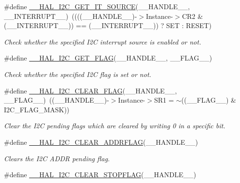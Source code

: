 \begin{DoxyCompactItemize}
\#define \hyperlink{group___i2_c___exported___macros_ga932024bf4a259e0cdaf9e50b38e3d41a}{\-\_\-\-\_\-\-H\-A\-L\-\_\-\-I2\-C\-\_\-\-G\-E\-T\-\_\-\-I\-T\-\_\-\-S\-O\-U\-R\-C\-E}(\-\_\-\-\_\-\-H\-A\-N\-D\-L\-E\-\_\-\-\_\-, \-\_\-\-\_\-\-I\-N\-T\-E\-R\-R\-U\-P\-T\-\_\-\-\_\-)~((((\-\_\-\-\_\-\-H\-A\-N\-D\-L\-E\-\_\-\-\_\-)-\/$>$Instance-\/$>$C\-R2 \& (\-\_\-\-\_\-\-I\-N\-T\-E\-R\-R\-U\-P\-T\-\_\-\-\_\-)) == (\-\_\-\-\_\-\-I\-N\-T\-E\-R\-R\-U\-P\-T\-\_\-\-\_\-)) ? S\-E\-T \-: R\-E\-S\-E\-T)
\begin{DoxyCompactList}\small\item\em Check whether the specified I2\-C interrupt source is enabled or not. \end{DoxyCompactList}\item 
\#define \hyperlink{group___i2_c___exported___macros_gafbdf01a7dc3183de7af56456cab93551}{\-\_\-\-\_\-\-H\-A\-L\-\_\-\-I2\-C\-\_\-\-G\-E\-T\-\_\-\-F\-L\-A\-G}(\-\_\-\-\_\-\-H\-A\-N\-D\-L\-E\-\_\-\-\_\-, \-\_\-\-\_\-\-F\-L\-A\-G\-\_\-\-\_\-)
\begin{DoxyCompactList}\small\item\em Check whether the specified I2\-C flag is set or not. \end{DoxyCompactList}\item 
\#define \hyperlink{group___i2_c___exported___macros_ga933e2ea67e86db857a06b70a93be1186}{\-\_\-\-\_\-\-H\-A\-L\-\_\-\-I2\-C\-\_\-\-C\-L\-E\-A\-R\-\_\-\-F\-L\-A\-G}(\-\_\-\-\_\-\-H\-A\-N\-D\-L\-E\-\_\-\-\_\-, \-\_\-\-\_\-\-F\-L\-A\-G\-\_\-\-\_\-)~((\-\_\-\-\_\-\-H\-A\-N\-D\-L\-E\-\_\-\-\_\-)-\/$>$Instance-\/$>$S\-R1 = $\sim$((\-\_\-\-\_\-\-F\-L\-A\-G\-\_\-\-\_\-) \& I2\-C\-\_\-\-F\-L\-A\-G\-\_\-\-M\-A\-S\-K))
\begin{DoxyCompactList}\small\item\em Clear the I2\-C pending flags which are cleared by writing 0 in a specific bit. \end{DoxyCompactList}\item 
\#define \hyperlink{group___i2_c___exported___macros_ga15a0a1a04971d44f9a1b82cab10af24f}{\-\_\-\-\_\-\-H\-A\-L\-\_\-\-I2\-C\-\_\-\-C\-L\-E\-A\-R\-\_\-\-A\-D\-D\-R\-F\-L\-A\-G}(\-\_\-\-\_\-\-H\-A\-N\-D\-L\-E\-\_\-\-\_\-)
\begin{DoxyCompactList}\small\item\em Clears the I2\-C A\-D\-D\-R pending flag. \end{DoxyCompactList}\item 
\#define \hyperlink{group___i2_c___exported___macros_gae8e94c16809df16411862b11fea781db}{\-\_\-\-\_\-\-H\-A\-L\-\_\-\-I2\-C\-\_\-\-C\-L\-E\-A\-R\-\_\-\-S\-T\-O\-P\-F\-L\-A\-G}(\-\_\-\-\_\-\-H\-A\-N\-D\-L\-E\-\_\-\-\_\-)

\end{DoxyCompactItemize}
